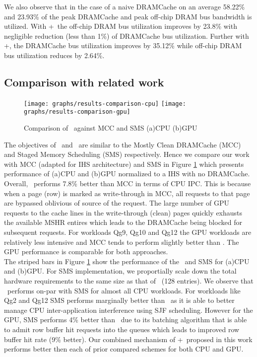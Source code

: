 \par We also observe that in the case of a naive DRAMCache on an average 58.22\% and 23.93\% of the peak DRAMCache and peak off-chip DRAM bus bandwidth is utilized. With \prioname+\bypassname\ the off-chip DRAM bus utilization improves by 23.8\% with negligible reduction (less than 1\%) of DRAMCache bus utilization. Further with \prioname+\chaining, the DRAMCache bus utilization improves by 35.12\% while off-chip DRAM bus utilization reduces by 2.64\%.

\subsection{Comparison with related work}
\begin{figure}[!htb]
	\centering
	\texttt{[image: graphs/results-comparison-cpu]}
	\texttt{[image: graphs/results-comparison-gpu]}
	\caption{Comparison of \cachename\ against MCC \cite{mostly-clean} and SMS \cite{sms} (a)CPU (b)GPU}
	\label{results-comparison}
\end{figure}

The objectives of \bypassname\ and \prioname\ are similar to the Mostly Clean DRAMCache (MCC) \cite{mostly-clean} and Staged Memory Scheduling (SMS) \cite{sms} respectively. Hence we compare our work with MCC (adapted for IHS architecture) and SMS in Figure \ref{results-comparison} which presents performance of (a)CPU and (b)GPU normalized to a IHS with no DRAMCache. 
Overall, \bypassname\ performs 7.8\% better than MCC in terms of CPU IPC.
This is because when a page (row) is marked as write-through in MCC, all requests to that page are bypassed oblivious of source of the request. The large number of GPU requests to the cache lines in the write-through (clean) pages quickly exhausts the available MSHR entires which leads to the DRAMCache being blocked for subsequent requests. For workloads Qg9, Qg10 and Qg12 the GPU workloads are relatively less intensive and MCC tends to perform slightly better than \bypassname. The GPU performance is comparable for both approaches. \\
The striped bars in Figure \ref{results-comparison} show the performance of the \prioname\ and SMS for (a)CPU and (b)GPU. For SMS implementation, we proportially scale down the total hardware requirements to the same size as that of \prioname\ (128 entries). We observe that \prioname\ performs on-par with SMS for almost all CPU workloads. For workloads like Qg2 and Qg12 SMS performs marginally better than \prioname\ as it is able to better manage CPU inter-application interference using SJF scheduling. However for the GPU, SMS performs 4\% better than \prioname\ due to its batching algorithm that is able to admit row buffer hit requests into the queues which leads to improved row buffer hit rate (9\% better). Our combined mechanism of \prioname+\bypassname\ proposed in this work performs better then each of prior compared schemes for both CPU and GPU.


